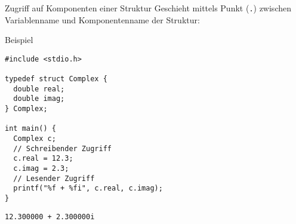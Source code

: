 \documentclass[presentation]{beamer}
\begin{document}
\begin{frame}[label={sec:org47788c3},fragile]{Zugriff auf Komponenten einer Struktur}
 Geschieht mittels Punkt ({\color{solarizedYellow}\verb!.!}) zwischen Variablenname und
Komponentenname der Struktur:
\begin{exampleblock}{Beispiel}
\begin{verbatim}
#include <stdio.h>

typedef struct Complex {
  double real;
  double imag;
} Complex;

int main() {
  Complex c;
  // Schreibender Zugriff
  c.real = 12.3;
  c.imag = 2.3;
  // Lesender Zugriff
  printf("%f + %fi", c.real, c.imag);
}
\end{verbatim}

\begin{verbatim}
12.300000 + 2.300000i
\end{verbatim}
\end{exampleblock}
\end{frame}
\end{document}
